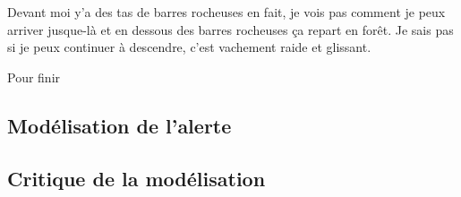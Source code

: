 \begin{dialogue*}
  \Req {} Devant moi y’a des tas de barres rocheuses en
  fait, je vois pas comment je peux arriver jusque-là et
   en dessous des barres rocheuses ça repart en
  forêt.  Je sais pas si je peux continuer à
  descendre, c’est vachement raide et glissant.
\end{dialogue*}
% 
Pour finir

\subsection{Modélisation de l'alerte}
\label{subsec:9-3-2}


\subsection{Critique de la modélisation}
\label{subsec:9-3-3}




